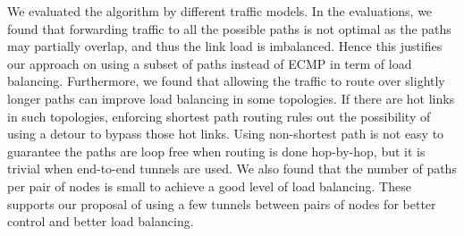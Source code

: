 \documentclass[conference]{IEEEtran}
\begin{document}
We evaluated the algorithm by different traffic models. In the evaluations, we
found that forwarding traffic to all the possible paths is not optimal as the
paths may partially overlap, and thus the link load is imbalanced. Hence this
justifies our approach on using a subset of paths instead of ECMP in term of
load balancing. Furthermore, we found that allowing the traffic to route over
slightly longer paths can improve load balancing in some topologies. If there
are hot links in such topologies, enforcing shortest path routing rules out the
possibility of using a detour to bypass those hot links. Using non-shortest
path is not easy to guarantee the paths are loop free when routing is done
hop-by-hop, but it is trivial when end-to-end tunnels are used. We also found
that the number of paths per pair of nodes is small to achieve a good level of
load balancing. These supports our proposal of using a few tunnels between
pairs of nodes for better control and better load balancing.

\balance



\label{docend}
\end{document}
